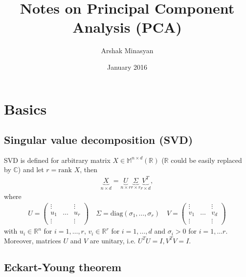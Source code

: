 \documentclass{article}
\title{Notes on Principal Component Analysis (PCA)}
\author{Arshak Minasyan}
\date{January 2016}
\begin{document}
\maketitle

\section{Basics}

\subsection{Singular value decomposition (SVD)} 
\par SVD is defined for arbitrary matrix $X \in \mathbb{M}^{n \times d} (\mathbb{R})$ ($\mathbb{R}$ could be easily replaced by $\mathbb{C}$) and let $r = \text{rank } X$, then 
\begin{align}
\underbrace{X}_{n \times d} = \underbrace{U}_{n \times r} \underbrace{\Sigma}_{r \times r} \underbrace{V^T}_{r \times d},
\end{align}
where 
\begin{align}
U = \begin{pmatrix} \vdots &  & \vdots \\ u_1 & \dots & u_r \\ \vdots &  & \vdots \end{pmatrix} \quad \Sigma = \text{diag}(\sigma_1, \dots, \sigma_r) \quad V = \begin{pmatrix} \vdots &  & \vdots \\ v_1 & \dots & v_d \\ \vdots &  & \vdots \end{pmatrix} 
\end{align}
with $u_i \in \mathbb{R}^n$ for $i = 1, \dots, r$, $v_i \in \mathbb{R}^r$ for $i = 1, \dots, d$ and $\sigma_i > 0$ for $i = 1, \dots r$. Moreover, matrices $U$ and $V$ are unitary, i.e. $U^TU = I, V^TV = I$.
\subsection{Eckart-Young theorem}
\end{document}
